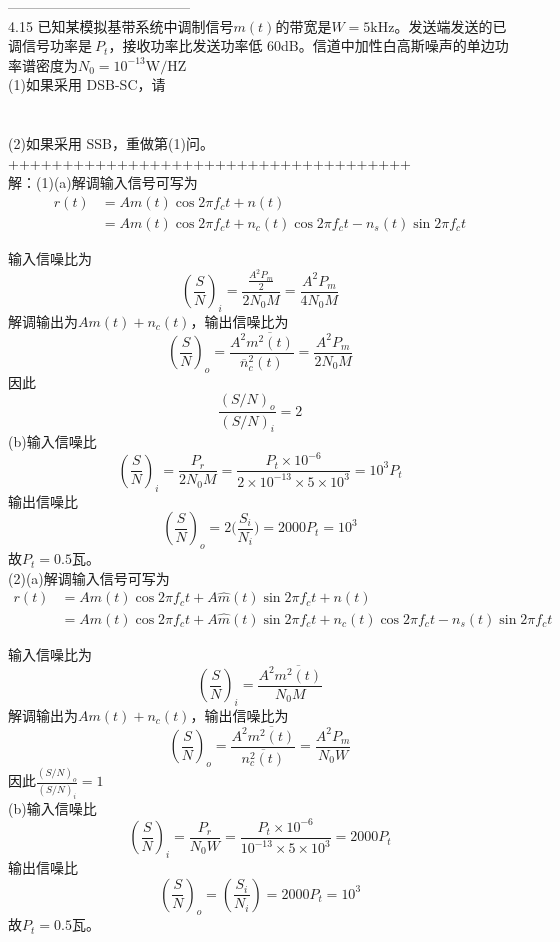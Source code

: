 \documentclass[utf8]{article}
\begin{document}
---------------------------------------\\
4.15 已知某模拟基带系统中调制信号$m(t)$的带宽是$W{=}5{\mathrm{kHz}}$。发送端发送的已调信号功率是$\ P_{t}$，接收功率比发送功率低 60dB。信道中加性白高斯噪声的单边功率谱密度为$N_{0}=10^{-13}\mathrm{W}/\mathrm{H}\mathrm{Z}$\\
(1)如果采用 DSB-SC，请\\
\indent{}\\
\indent{}\\
(2)如果采用 SSB，重做第(1)问。\\
+++++++++++++++++++++++++++++++++++++\\
解：(1)(a)解调输入信号可写为
\begin{align*}
r(t) &= A m(t) \cos 2\pi f_c t + n(t) \\
&= A m(t) \cos 2\pi f_c t + n_c(t) \cos 2\pi f_c t - n_s(t) \sin 2\pi f_c t
\end{align*}

输入信噪比为
$$\left(\frac{S}{N}\right)_{i}=\frac{\frac{A^2P_{m}}2}{2N_{0}M}=\frac{A^{2}P_{m}}{4N_{0}M}$$
解调输出为${\mathit{A}}m\left(t\right)+n_{c}\left(t\right)$，输出信噪比为
$$\left(\frac{S}{N}\right)_{o}=\frac{A^{2}\overline{{{m^{2}\left(t\right)}}}}{\overline{{{n}}}_{c}^{2}\left(t\right)}=\frac{A^{2}P_{m}}{2N_{0}M}$$
因此
$${\frac{\left(S/N\right)_{o}}{\left(S/N\right)_{i}}}=2$$
(b)输入信噪比
$$\left(\frac{S}{N}\right)_{i}=\frac{P_{r}}{2N_{0}M}=\frac{P_{t}\times10^{-6}}{2\times10^{-13}\times5\times10^{3}}=10^{3}P_{t}$$
输出信噪比
$$\left(\frac{S}{N}\right)_{o}=2\Biggl(\frac{S_{i}}{N_{i}}\Biggr)=2000P_{t}=10^{3}$$
故$P_{t}=0.5$瓦。\\
(2)(a)解调输入信号可写为
\begin{align*}
 r(t) &= A m(t) \cos 2\pi f_c t + A \hat{m}(t) \sin 2\pi f_c t + n(t)\\
 &= A m(t) \cos 2\pi f_c t + A \hat{m}(t) \sin 2\pi f_c t + n_c(t) \cos 2\pi f_c t - n_s(t) \sin 2\pi f_c t 
 \end{align*} 

输入信噪比为
$$\left(\frac{S}{N}\right)_{i}=\frac{A^{2}\overline{{{m^{2}\left(t\right)}}}}{N_{0}M}$$
解调输出为$A m\left(t\right)+n_{c}\left(t\right)$，输出信噪比为$$\left(\frac{S}{N}\right)_{o}=\frac{A^{2}\overline{{{m^{2}\left(t\right)}}}}{\overline{{{n_{c}^{2}\left(t\right)}}}}=\frac{A^{2}P_{m}}{N_{0}W}$$
因此$\frac{\left(S/N\right)_{o}}{\left(S/N\right)_{i}}=1$\\
(b)输入信噪比
$$\left(\frac{S}{N}\right)_{i}=\frac{P_{r}}{N_{0}W}{=}\frac{P_{t}\times10^{-6}}{10^{-13}\times5\times10^{3}}=2000P_{t}$$
输出信噪比
$$\left(\frac{S}{N}\right)_{o}=\left(\frac{S_{i}}{N_{i}}\right)=2000P_{t}=10^{3}$$
故$P_{t}=0.5$瓦。
\end{document}
